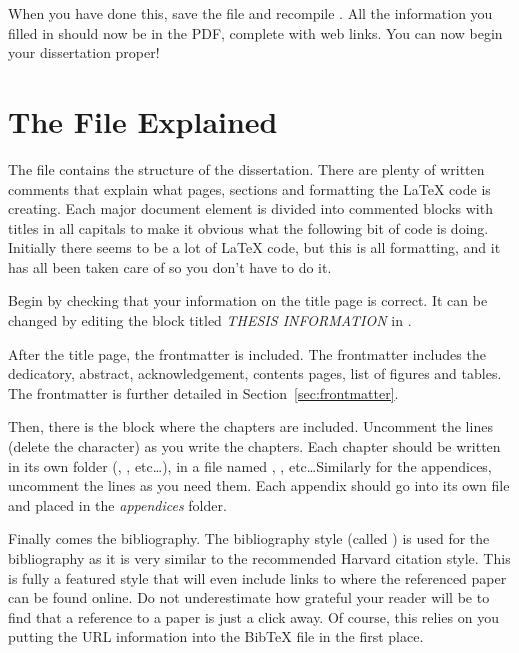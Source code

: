 When you have done this, save the file and recompile . All the information you filled in should now be in the PDF, complete with web links. You can now begin your dissertation proper!


\section{The  File Explained}

The  file contains the structure of the dissertation. There are plenty of written comments that explain what pages, sections and formatting the \LaTeX{} code is creating. Each major document element is divided into commented blocks with titles in all capitals to make it obvious what the following bit of code is doing. Initially there seems to be a lot of \LaTeX{} code, but this is all formatting, and it has all been taken care of so you don't have to do it.

Begin by checking that your information on the title page is correct. It can be changed by editing the block titled \emph{THESIS INFORMATION} in . 

After the title page, the frontmatter is included. The frontmatter includes the dedicatory, abstract, acknowledgement, contents pages, list of figures and tables. The frontmatter is further detailed in Section~\ref{sec:frontmatter}.

Then, there is the block where the chapters are included. Uncomment the lines (delete the \code{\%} character) as you write the chapters. Each chapter should be written in its own folder (, , etc\ldots), in a file named , , etc\ldots Similarly for the appendices, uncomment the lines as you need them. Each appendix should go into its own file and placed in the \emph{appendices} folder.

Finally comes the bibliography. The bibliography style (called ) is used for the bibliography as it is very similar to the recommended Harvard citation style. This is fully a featured style that will even include links to where the referenced paper can be found online. Do not underestimate how grateful your reader will be to find that a reference to a paper is just a click away. Of course, this relies on you putting the URL information into the BibTeX file in the first place.

